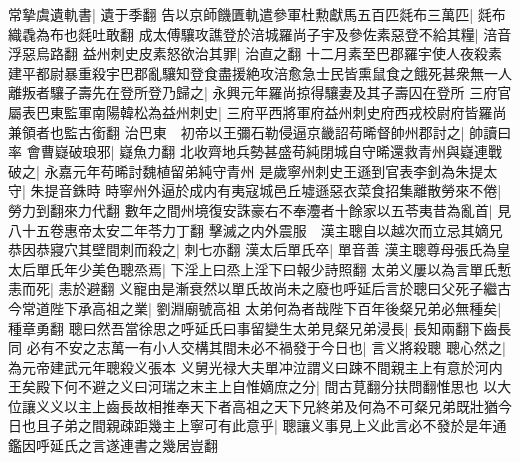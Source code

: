 常摯虞遺軌書|{
	遺于季翻}
告以京師饑匱軌遣參軍杜勲獻馬五百匹㲜布三萬匹|{
	㲜布織毳為布也㲜吐敢翻}
成太傅驤攻譙登於涪城羅尚子宇及參佐素惡登不給其糧|{
	涪音浮惡烏路翻}
益州刺史皮素怒欲治其罪|{
	治直之翻}
十二月素至巴郡羅宇使人夜殺素建平都尉暴重殺宇巴郡亂驤知登食盡援絶攻涪愈急士民皆熏鼠食之餓死甚衆無一人離叛者驤子壽先在登所登乃歸之|{
	永興元年羅尚掠得驤妻及其子壽囚在登所}
三府官屬表巴東監軍南陽韓松為益州刺史|{
	三府平西將軍府益州刺史府西戎校尉府皆羅尚兼領者也監古銜翻}
治巴東　初帝以王彌石勒侵逼京畿詔苟晞督帥州郡討之|{
	帥讀曰率}
會曹嶷破琅邪|{
	嶷魚力翻}
北收齊地兵勢甚盛苟純閉城自守晞還救青州與嶷連戰破之|{
	永嘉元年苟晞討魏植留弟純守青州}
是歲寧州刺史王遜到官表李釗為朱提太守|{
	朱提音銖時}
時寧州外逼於成内有夷寇城邑丘墟遜惡衣菜食招集離散勞來不倦|{
	勞力到翻來力代翻}
數年之間州境復安誅豪右不奉灋者十餘家以五苓夷昔為亂首|{
	見八十五卷惠帝太安二年苓力丁翻}
擊滅之内外震服　漢主聰自以越次而立忌其嫡兄恭因恭寢穴其壁間刺而殺之|{
	刺七亦翻}
漢太后單氏卒|{
	單音善}
漢主聰尊母張氏為皇太后單氏年少美色聰烝焉|{
	下淫上曰烝上淫下曰報少詩照翻}
太弟义屢以為言單氏慙恚而死|{
	恚於避翻}
义寵由是漸衰然以單氏故尚未之廢也呼延后言於聰曰父死子繼古今常道陛下承高祖之業|{
	劉淵廟號高祖}
太弟何為者哉陛下百年後粲兄弟必無種矣|{
	種章勇翻}
聰曰然吾當徐思之呼延氏曰事留變生太弟見粲兄弟浸長|{
	長知兩翻下齒長同}
必有不安之志萬一有小人交構其間未必不禍發于今日也|{
	言义將殺聰}
聰心然之|{
	為元帝建武元年聰殺义張本}
义舅光禄大夫單冲泣謂义曰踈不間親主上有意於河内王矣殿下何不避之义曰河瑞之末主上自惟嫡庶之分|{
	間古莧翻分扶問翻惟思也}
以大位讓义义以主上齒長故相推奉天下者高祖之天下兄終弟及何為不可粲兄弟既壯猶今日也且子弟之間親疎距幾主上寧可有此意乎|{
	聰讓义事見上义此言必不發於是年通鑑因呼延氏之言遂連書之幾居豈翻}


